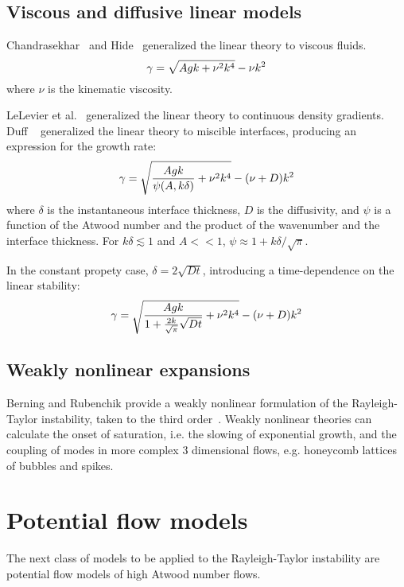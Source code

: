 \subsection{Viscous and diffusive linear models}
Chandrasekhar~\cite{Chandrasekhar1955} and Hide~\cite{Hide1955} generalized the linear theory to viscous fluids.
\begin{equation} \elabel{visc_growth}
  \gamma = \sqrt{A g k + \nu^2 k^4} - \nu k^2
\end{equation} 
where 
$\nu$ is the kinematic viscosity.

LeLevier et al.~\cite{LeLevier1955} generalized the linear theory to continuous density gradients.
Duff \etal~\cite{Duff1962} generalized the linear theory to miscible interfaces, producing an expression for the growth rate:
\begin{equation} \elabel{duff_simple}
\gamma = \sqrt{\frac{A g k}{\psi(A,k\delta)} + \nu^2 k^4} - (\nu + D) k^2
\end{equation}
where 
$\delta$ is the instantaneous interface thickness,
$D$ is the diffusivity,
and $\psi$ is a function of the Atwood number and the product of the wavenumber and the interface thickness.
For $k \delta \lesssim 1$ and $A << 1$, $\psi \approx 1 + k \delta / \sqrt{\pi}$.

In the constant propety case, $\delta = 2 \sqrt{D t}$, introducing a time-dependence on the linear stability:
\begin{equation} \elabel{duff_growth}
\gamma = \sqrt{\frac{A g k}{1 + \frac{2 k}{\sqrt{\pi}}\sqrt{D t} } + \nu^2 k^4} - (\nu + D) k^2
\end{equation}

\subsection{Weakly nonlinear expansions}
Berning and Rubenchik provide a weakly nonlinear formulation of the Rayleigh-Taylor instability, taken to the third order~\cite{Berning1998}.
Weakly nonlinear theories can calculate the onset of saturation, i.e. the slowing of exponential growth, and the coupling of modes in more complex 3 dimensional flows, e.g. honeycomb lattices of bubbles and spikes.

\section{Potential flow models}

The next class of models to be applied to the Rayleigh-Taylor instability are potential flow models of high Atwood number flows.

